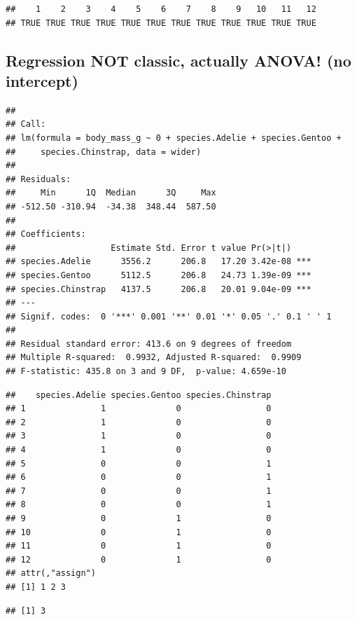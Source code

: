 \documentclass[
  openany]{book}
\begin{document}
\begin{verbatim}
##    1    2    3    4    5    6    7    8    9   10   11   12 
## TRUE TRUE TRUE TRUE TRUE TRUE TRUE TRUE TRUE TRUE TRUE TRUE
\end{verbatim}

\hypertarget{regression-not-classic-actually-anova-no-intercept}{%
\subsection{Regression NOT classic, actually ANOVA! (no intercept)}\label{regression-not-classic-actually-anova-no-intercept}}

\begin{verbatim}
## 
## Call:
## lm(formula = body_mass_g ~ 0 + species.Adelie + species.Gentoo + 
##     species.Chinstrap, data = wider)
## 
## Residuals:
##     Min      1Q  Median      3Q     Max 
## -512.50 -310.94  -34.38  348.44  587.50 
## 
## Coefficients:
##                   Estimate Std. Error t value Pr(>|t|)    
## species.Adelie      3556.2      206.8   17.20 3.42e-08 ***
## species.Gentoo      5112.5      206.8   24.73 1.39e-09 ***
## species.Chinstrap   4137.5      206.8   20.01 9.04e-09 ***
## ---
## Signif. codes:  0 '***' 0.001 '**' 0.01 '*' 0.05 '.' 0.1 ' ' 1
## 
## Residual standard error: 413.6 on 9 degrees of freedom
## Multiple R-squared:  0.9932, Adjusted R-squared:  0.9909 
## F-statistic: 435.8 on 3 and 9 DF,  p-value: 4.659e-10
\end{verbatim}

\begin{verbatim}
##    species.Adelie species.Gentoo species.Chinstrap
## 1               1              0                 0
## 2               1              0                 0
## 3               1              0                 0
## 4               1              0                 0
## 5               0              0                 1
## 6               0              0                 1
## 7               0              0                 1
## 8               0              0                 1
## 9               0              1                 0
## 10              0              1                 0
## 11              0              1                 0
## 12              0              1                 0
## attr(,"assign")
## [1] 1 2 3
\end{verbatim}

\begin{verbatim}
## [1] 3
\end{verbatim}
\end{document}
